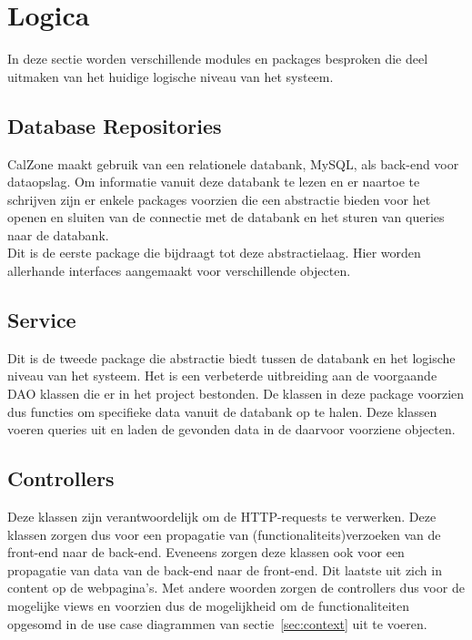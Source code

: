 \section{Logica}
\label{sec:logica}
In deze sectie worden verschillende modules en packages besproken die deel uitmaken van het huidige logische niveau van het systeem.

\subsection{Database Repositories}
\label{subsec:databaseRepo}
CalZone maakt gebruik van een relationele databank, MySQL, als back-end voor dataopslag. 
Om informatie vanuit deze databank te lezen en er naartoe te schrijven zijn er enkele packages voorzien die een abstractie bieden voor het openen en sluiten van de connectie met de databank en het sturen van queries naar de databank.\\ 

Dit is de eerste package die bijdraagt tot deze abstractielaag.
Hier worden allerhande interfaces aangemaakt voor verschillende objecten.

\subsection{Service}
\label{subsec:service}
Dit is de tweede package die abstractie biedt tussen de databank en het logische niveau van het systeem. 
Het is een verbeterde uitbreiding aan de voorgaande DAO klassen die er in het project bestonden. 
De klassen in deze package voorzien dus functies om specifieke data vanuit de databank op te halen.
Deze klassen voeren queries uit en laden de gevonden data in de daarvoor voorziene objecten.

\subsection{Controllers}
\label{subsec:controllers}
Deze klassen zijn verantwoordelijk om de HTTP-requests te verwerken. 
Deze klassen zorgen dus voor een propagatie van (functionaliteits)verzoeken van de front-end naar de back-end. 
Eveneens zorgen deze klassen ook voor een propagatie van data van de back-end naar de front-end. 
Dit laatste uit zich in content op de webpagina's.
Met andere woorden zorgen de controllers dus voor de mogelijke views en voorzien dus de mogelijkheid om de functionaliteiten opgesomd in de use case diagrammen van sectie~\ref{sec:context} uit te voeren. 

